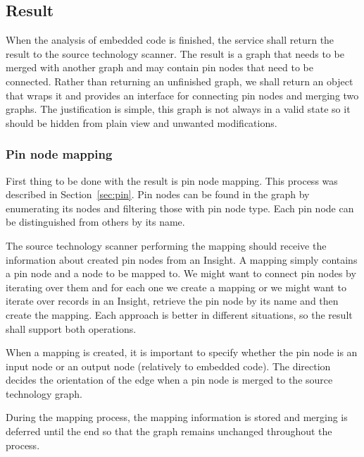 \subsection{Result}

When the analysis of embedded code is finished, the service shall return the result to the source technology scanner. The result is a graph that needs to be merged with another graph and may contain pin nodes that need to be connected. Rather than returning an unfinished graph, we shall return an object that wraps it and provides an interface for connecting pin nodes and merging two graphs. The justification is simple, this graph is not always in a valid state so it should be hidden from plain view and unwanted modifications.

\subsubsection{Pin node mapping}
First thing to be done with the result is pin node mapping. This process was described in Section~\ref{sec:pin}. Pin nodes can be found in the graph by enumerating its nodes and filtering those with pin node type. Each pin node can be distinguished from others by its name.
\par
The source technology scanner performing the mapping should receive the information about created pin nodes from an Insight. A mapping simply contains a pin node and a node to be mapped to. We might want to connect pin nodes by iterating over them and for each one we create a mapping or we might want to iterate over records in an Insight, retrieve the pin node by its name and then create the mapping. Each approach is better in different situations, so the result shall support both operations.
\par
When a mapping is created, it is important to specify whether the pin node is an input node or an output node (relatively to embedded code). The direction decides the orientation of the edge when a pin node is merged to the source technology graph.
\par
During the mapping process, the mapping information is stored and merging is deferred until the end so that the graph remains unchanged throughout the process.

